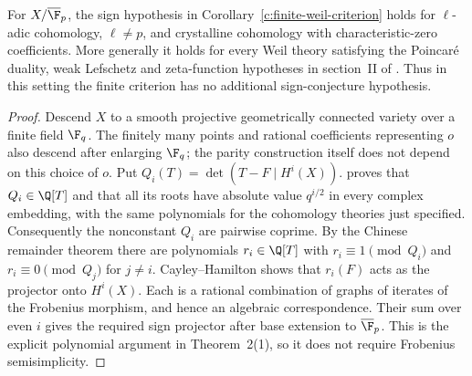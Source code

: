\begin{corollary}
\label{c:finite-field-sign}
For $X/\overline{\F}_p$, the sign hypothesis in
Corollary~\ref{c:finite-weil-criterion} holds for $\ell$-adic
cohomology, $\ell\ne p$, and crystalline cohomology with
characteristic-zero coefficients.  More generally it holds for
every Weil theory satisfying the Poincar\'e duality, weak
Lefschetz and zeta-function hypotheses in section~II of
\citet{c_katzmessing1974}.  Thus in this setting the finite
criterion has no additional sign-conjecture hypothesis.
\end{corollary}

\begin{proof}
Descend $X$ to a smooth projective geometrically connected variety
over a finite field $\F_q$.  The finitely many points and rational
coefficients representing $o$ also descend after enlarging
$\F_q$; the parity construction itself does not depend on this
choice of $o$.  Put
$Q_i(T)=\det(T-F\mid H^i(X))$.
\citet[Theorem~1, pp.~74--75; Theorem~2(1), pp.~76--77]{c_katzmessing1974}
proves that $Q_i\in\Q[T]$ and that all its roots have absolute
value $q^{i/2}$ in every complex embedding, with the same
polynomials for the cohomology theories just specified.
Consequently the nonconstant $Q_i$ are pairwise coprime.
By the Chinese remainder theorem there are polynomials
$r_i\in\Q[T]$ with $r_i\equiv1\pmod{Q_i}$ and
$r_i\equiv0\pmod{Q_j}$ for $j\ne i$.
Cayley--Hamilton shows that $r_i(F)$ acts as the projector onto
$H^i(X)$.  Each is a rational combination of graphs of iterates
of the Frobenius morphism, and hence an algebraic correspondence.
Their sum over even $i$ gives the required sign projector after
base extension to $\overline{\F}_p$.  This is the explicit
polynomial argument in Theorem~2(1), so it does not require
Frobenius semisimplicity.
\end{proof}

